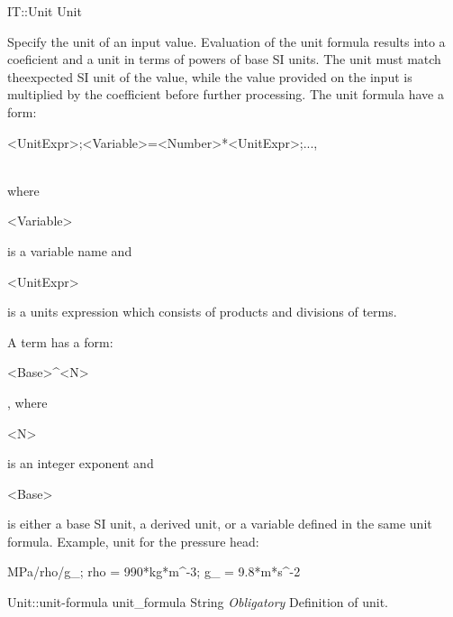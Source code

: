 \begin{RecordType}
	{IT::Unit}
	{Unit}
	{}%
	{}%
	{{{{Specify the unit of an input value.
Evaluation of the unit formula results into a coeficient and a unit in terms of powers of base SI units.
The unit must match theexpected SI unit of the value, while the value provided on the input is multiplied by the coefficient before further processing.
The unit formula have a form:}\\
\begin{ttfamily}{\textless}UnitExpr{\textgreater};{\textless}Variable{\textgreater}={\textless}Number{\textgreater}*{\textless}UnitExpr{\textgreater};...,\end{ttfamily}\\{
where }\begin{ttfamily}{\textless}Variable{\textgreater}\end{ttfamily}{ is a variable name and }\begin{ttfamily}{\textless}UnitExpr{\textgreater}\end{ttfamily}{ is a units expression which consists of products and divisions of terms.}
% 
}{{A term has a form: }\begin{ttfamily}{\textless}Base{\textgreater}{\^{}}{\textless}N{\textgreater}\end{ttfamily}{, where }\begin{ttfamily}{\textless}N{\textgreater}\end{ttfamily}{ is an integer exponent and }\begin{ttfamily}{\textless}Base{\textgreater}\end{ttfamily}{ is either a base SI unit, a derived unit, or a variable defined in the same unit formula.
Example, unit for the pressure head:}
% 
}{{}\begin{ttfamily}MPa/rho/g{\_}; rho = 990*kg*m{\^{}}-3; g{\_} = 9.8*m*s{\^{}}-2\end{ttfamily}%
}}}
		\RecKey
			{Unit::unit-formula}
			{unit{\_}formula}
			{{String}}{}
			{ \it{Obligatory}}
			{{{Definition of unit.}%
}}
\end{RecordType}
